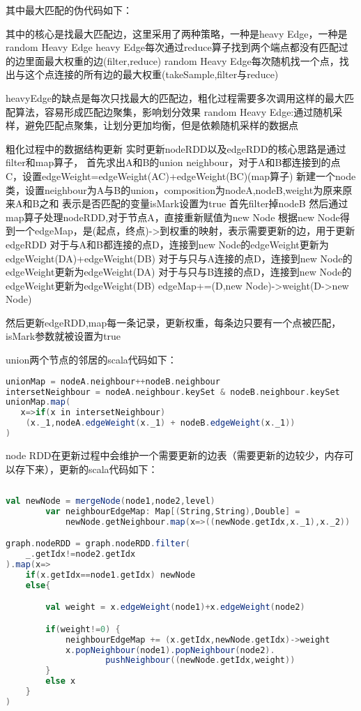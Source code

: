 其中最大匹配的伪代码如下：


其中的核心是找最大匹配边，这里采用了两种策略，一种是heavy Edge，一种是random Heavy Edge
heavy Edge每次通过reduce算子找到两个端点都没有匹配过的边里面最大权重的边(filter,reduce)
random Heavy Edge每次随机找一个点，找出与这个点连接的所有边的最大权重(takeSample,filter与reduce)

heavyEdge的缺点是每次只找最大的匹配边，粗化过程需要多次调用这样的最大匹配算法，容易形成匹配边聚集，影响划分效果
random Heavy Edge:通过随机采样，避免匹配点聚集，让划分更加均衡，但是依赖随机采样的数据点

粗化过程中的数据结构更新
实时更新nodeRDD以及edgeRDD的核心思路是通过filter和map算子，
首先求出A和B的union neighbour，对于A和B都连接到的点C，设置edgeWeight=edgeWeight(AC)+edgeWeight(BC)(map算子)
新建一个node类，设置neighbour为A与B的union，composition为nodeA,nodeB,weight为原来原来A和B之和
表示是否匹配的变量isMark设置为true
首先filter掉nodeB
然后通过map算子处理nodeRDD,对于节点A，直接重新赋值为new Node
根据new Node得到一个edgeMap，是(起点，终点)->到权重的映射，表示需要更新的边，用于更新edgeRDD
对于与A和B都连接的点D，连接到new Node的edgeWeight更新为edgeWeight(DA)+edgeWeight(DB)
对于与只与A连接的点D，连接到new Node的edgeWeight更新为edgeWeight(DA)
对于与只与B连接的点D，连接到new Node的edgeWeight更新为edgeWeight(DB)
edgeMap+=(D,new Node)->weight(D->new Node)

然后更新edgeRDD,map每一条记录，更新权重，每条边只要有一个点被匹配，isMark参数就被设置为true


union两个节点的邻居的scala代码如下：

\begin{lstlisting}[language=Scala]
unionMap = nodeA.neighbour++nodeB.neighbour
intersetNeighbour = nodeA.neighbour.keySet & nodeB.neighbour.keySet
unionMap.map(
   x=>if(x in intersetNeighbour)
    (x._1,nodeA.edgeWeight(x._1) + nodeB.edgeWeight(x._1))
)
\end{lstlisting}

node RDD在更新过程中会维护一个需要更新的边表（需要更新的边较少，内存可以存下来），更新的scala代码如下：

\begin{lstlisting}[language=Scala]
    
val newNode = mergeNode(node1,node2,level)
        var neighbourEdgeMap: Map[(String,String),Double] =
            newNode.getNeighbour.map(x=>((newNode.getIdx,x._1),x._2))

graph.nodeRDD = graph.nodeRDD.filter(
    _.getIdx!=node2.getIdx
).map(x=>
    if(x.getIdx==node1.getIdx) newNode
    else{

        val weight = x.edgeWeight(node1)+x.edgeWeight(node2)

        if(weight!=0) {
            neighbourEdgeMap += (x.getIdx,newNode.getIdx)->weight
            x.popNeighbour(node1).popNeighbour(node2).
                    pushNeighbour((newNode.getIdx,weight))
        }
        else x
    }
)
\end{lstlisting}

